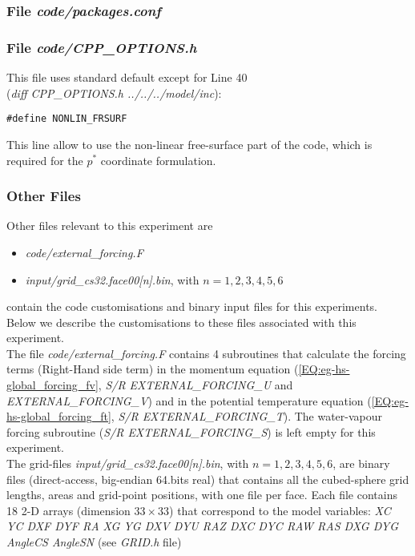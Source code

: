 \subsubsection{File {\it code/packages.conf}}
\label{www:tutorials}



\subsubsection{File {\it code/CPP\_OPTIONS.h}}
\label{www:tutorials}

This file uses standard default except for Line 40\\
({\it diff CPP\_OPTIONS.h ../../../model/inc}):
\begin{verbatim}
#define NONLIN_FRSURF 
\end{verbatim}
This line allow to use the non-linear free-surface part of the code,
which is required for the $p^*$ coordinate formulation.

\subsubsection{Other Files }
\label{www:tutorials}

Other files relevant to this experiment are
\begin{itemize}
\item {\it code/external\_forcing.F}
\item {\it input/grid\_cs32.face00[n].bin}, with $n=1,2,3,4,5,6$
\end{itemize}
contain the code customisations and binary input files for this 
experiments. Below we describe the customisations
to these files associated with this experiment.\\

The file {\it code/external\_forcing.F} contains 4 subroutines
that calculate the forcing terms (Right-Hand side term) in the
momentum equation (\ref{EQ:eg-hs-global_forcing_fv}, 
{\it S/R EXTERNAL\_FORCING\_U} and {\it EXTERNAL\_FORCING\_V})
and in the potential temperature equation 
(\ref{EQ:eg-hs-global_forcing_ft}, {\it S/R  EXTERNAL\_FORCING\_T}). 
The water-vapour forcing subroutine ({\it S/R EXTERNAL\_FORCING\_S})
is left empty for this experiment.\\

The grid-files {\it input/grid\_cs32.face00[n].bin}, with $n=1,2,3,4,5,6$,
are binary files (direct-access, big-endian 64.bits real) that 
contains all the cubed-sphere grid lengths, areas and grid-point
positions, with one file per face.
Each file contains 18 2-D arrays (dimension $33 \times 33$) that correspond
to the model variables:
{\it 
XC YC DXF DYF RA XG YG DXV DYU RAZ DXC DYC RAW RAS DXG DYG AngleCS AngleSN 
}
(see {\it GRID.h} file)


